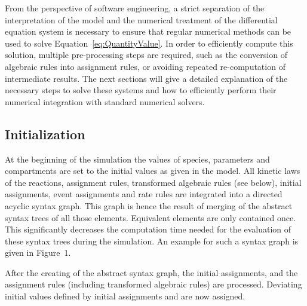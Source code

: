 \documentclass[10pt]{bmc_article}
\newenvironment{bmcformat}{\baselineskip20pt\sloppy\setboolean{publ}{false}}{\baselineskip20pt\sloppy}
\begin{document}
\begin{bmcformat}
From the perspective of software engineering, a strict separation of the 
interpretation of the model and the numerical treatment of the differential
equation system is necessary to ensure that regular numerical methods can be used
to solve Equation~\ref{eq:QuantityValue}.
In order to efficiently compute this solution, multiple pre-processing steps are
required, such as the conversion of algebraic rules into assignment rules, or
avoiding repeated re-computation of intermediate results.
The next sections will give a detailed explanation of the necessary steps to
solve these systems and how to efficiently perform their numerical integration
with standard numerical solvers.


\subsection*{Initialization}

At the beginning of the simulation the values of species, parameters and
compartments are set to the initial values as given in the model.
All kinetic laws of the reactions, assignment rules, transformed algebraic
rules (see below), initial assignments, event assignments and rate rules
are integrated into a directed acyclic syntax graph.
This graph is hence the result of merging of the abstract syntax trees of
all those elements.
Equivalent elements are only contained once.
This significantly decreases the computation time needed for the
evaluation of these syntax trees during the simulation.
An example for such a syntax graph is given in Figure~1.

After the creating of the abstract syntax graph, the initial assignments, and the
assignment rules (including transformed algebraic rules) are processed.
Deviating initial values defined by initial assignments and are now assigned.



\end{bmcformat}
\end{document}
